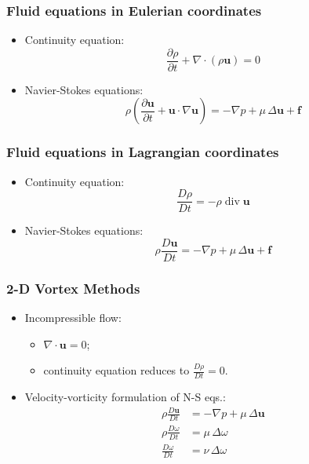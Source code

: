 \documentclass[12pt,english]{beamer}
\renewcommand{\vec}{\mathbf}
\newcommand{\vel}{\vec u}    %
\DeclareMathOperator{\divergence}{div}
\newcommand{\pd}[2]{\frac{\partial #1}{\partial #2}}
\newcommand{\md}[2]{\frac{D#1}{D#2}}
\begin{document}
  \begin{frame}
    \frametitle{Fluid equations in Eulerian coordinates}
    \begin{itemize}
      \item Continuity equation:
        \begin{equation}
          \pd{ρ}{t} + ∇\cdot(ρ\vel) = 0
        \end{equation}
      \item Navier-Stokes equations:
        \begin{equation}
          ρ\left(\pd{\vel}{t} + \vel\cdot∇\vel\right) = -∇p + μ\,Δ\vel + \vec{f}
        \end{equation}
    \end{itemize}
  \end{frame}

  \begin{frame}
    \frametitle{Fluid equations in Lagrangian coordinates}
    \begin{itemize}
      \item Continuity equation:
        \begin{equation}
          \md{ρ}{t} = -ρ\divergence\vel
        \end{equation}
      \item Navier-Stokes equations:
        \begin{equation}
          ρ\md{\vel}{t} = -∇p + μ\,Δ\vel + \vec{f}
        \end{equation}
    \end{itemize}
  \end{frame}

  \begin{frame}
    \frametitle{2-D Vortex Methods}
    \begin{itemize}
      \item Incompressible flow:
        \begin{itemize}
          \item  \(∇\cdot\vel = 0\);
          \item continuity equation reduces to \(\displaystyle\md{ρ}{t} = 0\).
        \end{itemize}
      \item Velocity-vorticity formulation of N-S eqs.:
        \begin{align}
          ρ\md{\vel}{t} &= -∇p + μ\,Δ\vel \\
          ρ\md{ω}{t}    &= μ\,Δω \\
          \md{ω}{t}    &= ν\,Δω
        \end{align}
    \end{itemize}
  \end{frame}
\end{document}

